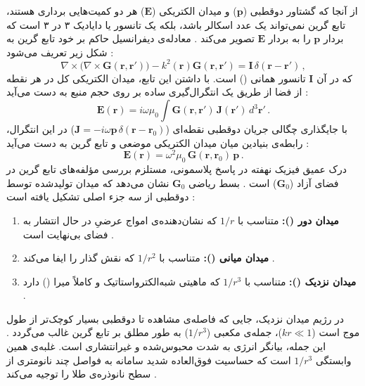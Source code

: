 \documentclass[12pt,a4paper]{report}
\begin{document}
از آنجا که گشتاور دوقطبی ($\mathbf{p}$) و میدان الکتریکی ($\mathbf{E}$) هر دو کمیت‌هایی برداری هستند، تابع گرین نمی‌تواند یک عدد اسکالر باشد، بلکه یک تانسور یا دایادیک ۳ در ۳ است که بردار $\mathbf{p}$ را به بردار $\mathbf{E}$ تصویر می‌کند \cite{novotny}. معادله‌ی دیفرانسیل حاکم بر خود تابع گرین به شکل زیر تعریف می‌شود \cite{novotny}:
\begin{equation}
\nabla\times\big(\nabla\times\mathbf{G}(\mathbf{r},\mathbf{r}')\big)-k^2(\mathbf{r})\mathbf{G}(\mathbf{r},\mathbf{r}')=\mathbf{I}\,\delta(\mathbf{r}-\mathbf{r}')\,,
\end{equation}
که در آن $\mathbf{I}$ تانسور همانی () است. با داشتن این تابع، میدان الکتریکی کل در هر نقطه از فضا از طریق یک انتگرال‌گیری ساده بر روی حجم منبع به دست می‌آید \cite{novotny}:
\begin{equation}
\mathbf{E}(\mathbf{r})=i\omega\mu_0\int\mathbf{G}(\mathbf{r},\mathbf{r}')\,\mathbf{J}(\mathbf{r}')\,d^3\mathbf{r}'\,.
\end{equation}
با جایگذاری چگالی جریان دوقطبی نقطه‌ای ($\mathbf{J}=-i\omega\mathbf{p}\,\delta(\mathbf{r}-\mathbf{r}_0)$) در این انتگرال، رابطه‌ی بنیادین میان میدان الکتریکی موضعی و تابع گرین به دست می‌آید \cite{novotny}:
\begin{equation}
\mathbf{E}(\mathbf{r})=\omega^2\mu_0\,\mathbf{G}(\mathbf{r},\mathbf{r}_0)\,\mathbf{p}\,.
\end{equation}
درک عمیق فیزیک نهفته در پاسخ پلاسمونی، مستلزم بررسی مؤلفه‌های تابع گرین در فضای آزاد ($\mathbf{G}_0$) است \cite{novotny}. بسط ریاضی $\mathbf{G}_0$ نشان می‌دهد که میدان تولیدشده توسط دوقطبی از سه جزء اصلی تشکیل یافته است \cite{novotny}:
\begin{enumerate}
\item \textbf{میدان دور ():} متناسب با $1/r$ که نشان‌دهنده‌ی امواج عرضیِ در حال انتشار به فضای بی‌نهایت است \cite{novotny}.
\item \textbf{میدان میانی ():} متناسب با $1/r^2$ که نقش گذار را ایفا می‌کند \cite{novotny}.
\item \textbf{میدان نزدیک ():} متناسب با $1/r^3$ که ماهیتی شبه‌الکترواستاتیک و کاملاً میرا () دارد \cite{novotny,maier}.
\end{enumerate}
در رژیم میدان نزدیک، جایی که فاصله‌ی مشاهده تا دوقطبی بسیار کوچک‌تر از طول موج است ($kr\ll1$)، جمله‌ی مکعبی ($1/r^3$) به طور مطلق بر تابع گرین غالب می‌گردد \cite{novotny}. این جمله، بیانگر انرژی به شدت محبوس‌شده و غیرانتشاری است. غلبه‌ی همین وابستگی $1/r^3$ است که حساسیت فوق‌العاده شدید سامانه به فواصل چند نانومتری از سطح نانوذره‌ی طلا را توجیه می‌کند \cite{novotny,maier}.
\end{document}
